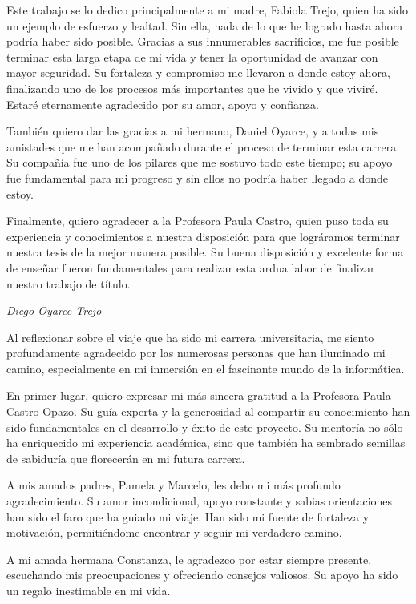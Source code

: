 Este trabajo se lo dedico principalmente a mi madre, Fabiola Trejo, quien ha sido un ejemplo de esfuerzo y lealtad. Sin ella, nada de lo que he logrado hasta ahora podría haber sido posible. Gracias a sus innumerables sacrificios, me fue posible terminar esta larga etapa de mi vida y tener la oportunidad de avanzar con mayor seguridad. Su fortaleza y compromiso me llevaron a donde estoy ahora, finalizando uno de los procesos más importantes que he vivido y que viviré. Estaré eternamente agradecido por su amor, apoyo y confianza.

También quiero dar las gracias a mi hermano, Daniel Oyarce, y a todas mis amistades que me han acompañado durante el proceso de terminar esta carrera. Su compañía fue uno de los pilares que me sostuvo todo este tiempo; su apoyo fue fundamental para mi progreso y sin ellos no podría haber llegado a donde estoy.

Finalmente, quiero agradecer a la Profesora Paula Castro, quien puso toda su experiencia y conocimientos a nuestra disposición para que lográramos terminar nuestra tesis de la mejor manera posible. Su buena disposición y excelente forma de enseñar fueron fundamentales para realizar esta ardua labor de finalizar nuestro trabajo de título.

\textit{Diego Oyarce Trejo}

\newpage
Al reflexionar sobre el viaje que ha sido mi carrera universitaria, me siento profundamente agradecido por las numerosas personas que han iluminado mi camino, especialmente en mi inmersión en el fascinante mundo de la informática.

En primer lugar, quiero expresar mi más sincera gratitud a la Profesora Paula Castro Opazo. Su guía experta y la generosidad al compartir su conocimiento han sido fundamentales en el desarrollo y éxito de este proyecto. Su mentoría no sólo ha enriquecido mi experiencia académica, sino que también ha sembrado semillas de sabiduría que florecerán en mi futura carrera.

A mis amados padres, Pamela y Marcelo, les debo mi más profundo agradecimiento. Su amor incondicional, apoyo constante y sabias orientaciones han sido el faro que ha guiado mi viaje. Han sido mi fuente de fortaleza y motivación, permitiéndome encontrar y seguir mi verdadero camino.

A mi amada hermana Constanza, le agradezco por estar siempre presente, escuchando mis preocupaciones y ofreciendo consejos valiosos. Su apoyo ha sido un regalo inestimable en mi vida.

